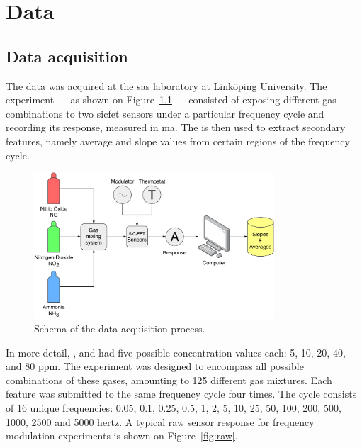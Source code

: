 \chapter{Data}
\label{cha:data}

\section{Data acquisition}
\label{sec:data-acquisition}

The data was acquired at the \acrfull{sas} laboratory at Linköping University. The experiment --- as shown on Figure~\ref{fig:experimental-setup} --- consisted of exposing different gas combinations to two \acrshort{sicfet} sensors under a particular frequency cycle and recording its response, measured in \acrfull{ma}. The is then used to extract secondary features, namely average and slope values from certain regions of the frequency cycle.

\begin{figure}[!htb]
	\centering
	\includegraphics[width=0.8\textwidth]{../figures/experimental-setup.pdf}
	\caption{Schema of the data acquisition process.}
	\label{fig:experimental-setup}
\end{figure}

In more detail, ,  and  had five possible concentration values each: 5, 10, 20, 40, and 80 \acrfull{ppm}. The experiment was designed to encompass all possible combinations of these gases, amounting to 125 different gas mixtures. Each feature was submitted to the same frequency cycle four times. The cycle consists of 16 unique frequencies: 0.05, 0.1, 0.25, 0.5, 1, 2, 5, 10, 25, 50, 100, 200, 500, 1000, 2500 and 5000 \acrfull{hertz}. A typical raw sensor response for frequency modulation experiments is shown on Figure~\ref{fig:raw}.

